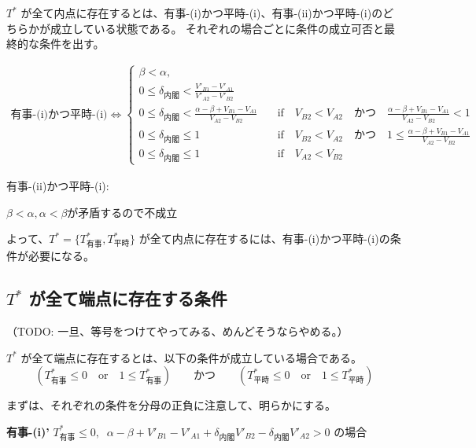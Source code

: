 \documentclass[main.tex]{subfiles}
\begin{document}
\bigskip
$T^*$ が全て内点に存在するとは、有事-(i)かつ平時-(i)、有事-(ii)かつ平時-(i)のどちらかが成立している状態である。
それぞれの場合ごとに条件の成立可否と最終的な条件を出す。

\noindent
\begin{align*}
    \text{有事-(i)かつ平時-(i)} \Leftrightarrow 
    \begin{cases}
        \beta < \alpha, \\
        0 \le \delta_{内閣} < \frac{V'_{B1}-V'_{A1}}{V'_{A2} - V'_{B2}}\\
        0 \le \delta_{内閣} < \frac{\alpha-\beta + V_{B1}-V_{A1}}{V_{A2} - V_{B2}} \quad&\text{if}\quad V_{B2} < V_{A2} \quad{かつ}\quad \frac{\alpha-\beta + V_{B1}-V_{A1}}{V_{A2} - V_{B2}}<1\\
        0 \le \delta_{内閣} \le 1 \quad&\text{if}\quad V_{B2} < V_{A2} \quad{かつ}\quad 1 \le \frac{\alpha-\beta + V_{B1}-V_{A1}}{V_{A2} - V_{B2}}\\
        0 \le \delta_{内閣} \le 1 \quad&\text{if}\quad V_{A2} < V_{B2}
    \end{cases}
\end{align*}

\noindent
有事-(ii)かつ平時-(i):

$\beta < \alpha, \alpha < \beta$が矛盾するので不成立


\bigskip
よって、$T^* = \lbrace T^*_{有事}, T^*_{平時} \rbrace$ が全て内点に存在するには、有事-(i)かつ平時-(i)の条件が必要になる。







\subsection{$T^*$ が全て端点に存在する条件}

（TODO: 一旦、等号をつけてやってみる、めんどそうならやめる。）

$T^*$ が全て端点に存在するとは、以下の条件が成立している場合である。\\
$$(T^*_{有事} \le 0 \quad\text{or}\quad 1 \le T^*_{有事}) \quad\quad\text{かつ}\quad\quad (T^*_{平時} \le 0 \quad\text{or}\quad 1 \le T^*_{平時}) $$


まずは、それぞれの条件を分母の正負に注意して、明らかにする。

\bigskip
\textbf{有事-(i)'}\; $T^*_{有事} \le 0,\;\; \alpha-\beta + V'_{B1}-V'_{A1} + \delta_{内閣}V'_{B2} - \delta_{内閣}V'_{A2} > 0$ の場合
\end{document}
